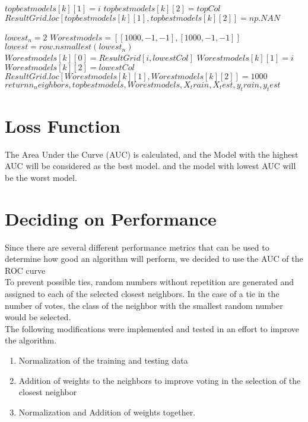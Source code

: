 \documentclass{article}
\begin{document}
\begin{algorithm}[H]
\begin{algorithmic}[1]
                    
                   \STATE $ topbestmodels[k][1]=i $
                   \STATE $ topbestmodels[k][2]=topCol  $          
            \STATE $ ResultGrid.loc[topbestmodels[k][1], topbestmodels[k][2]]=np.NAN $ 
            \ENDIF
            \ENDFOR
\ENDFOR
\ENDFOR

    \STATE $lowest_n=2$
   \STATE $Worestmodels = [[1000,-1,-1], [1000,-1,-1]]$
             \STATE  $lowest = row.nsmallest(lowest_n)$
                    \STATE $Worestmodels[k][0]=ResultGrid[i, lowestCol]$
                   \STATE $Worestmodels[k][1]=i$
                   \STATE  $Worestmodels[k][2]=lowestCol   $         
            \STATE $ResultGrid.loc[Worestmodels[k][1], Worestmodels[k][2]]=1000 $
             \ENDIF
\ENDFOR
\ENDFOR
\ENDFOR
    \STATE $return n_neighbors,topbestmodels,Worestmodels,X_train, X_test, y_train, y_test$

\end{algorithmic}
\end{algorithm}


\section{Loss Function }  
The Area Under the Curve (AUC) is calculated, and the Model with the highest AUC will be considered as the best model. and the model with lowest AUC will be  the worst model. 

\section{Deciding on Performance}  

Since there are several different performance metrics that can be used to determine how good an algorithm will perform, we decided to use the AUC of the ROC curve \\

To prevent possible ties, random numbers without repetition are generated and assigned to each of the selected closest neighbors. In the case of a tie in the number of votes, the class of the neighbor with the smallest random number would be selected. \\ The following modifications were implemented and tested in an effort to improve the algorithm.
\begin{enumerate}
\item Normalization of the training and testing data
\item Addition of weights to the neighbors to improve voting in the selection of the closest neighbor
\item Normalization and Addition of weights together.
\end{enumerate}
\end{document}
